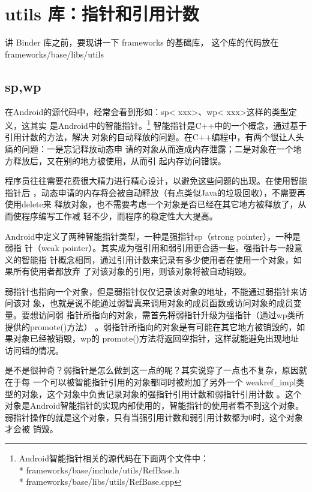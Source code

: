 \documentclass[a4paper,11pt]{article}
\begin{document}
\section{utils 库：指针和引用计数}
\iffalse
讲 Binder 库之前，要现讲一下 frameworks 的基础库， 这个库的代码放在
frameworks/base/libs/utils
\subsection{sp,wp}

在Android的源代码中，经常会看到形如：sp< xxx>、wp< xxx>这样的类型定义，这其实
是Android中的智能指针。\footnote{
Android智能指针相关的源代码在下面两个文件中：\\*
frameworks/base/include/utils/RefBase.h\\*
frameworks/base/libs/utils/RefBase.cpp
}
智能指针是C++中的一个概念，通过基于引用计数的方法，解决
对象的自动释放的问题。在C++编程中，有两个很让人头痛的问题：一是忘记释放动态申
请的对象从而造成内存泄露；二是对象在一个地方释放后，又在别的地方被使用，从而引
起内存访问错误。

程序员往往需要花费很大精力进行精心设计，以避免这些问题的出现。在使用智能指针后
，动态申请的内存将会被自动释放（有点类似Java的垃圾回收），不需要再使用delete来
释放对象，也不需要考虑一个对象是否已经在其它地方被释放了，从而使程序编写工作减
轻不少，而程序的稳定性大大提高。


Android中定义了两种智能指针类型，一种是强指针sp（strong pointer），一种是弱指
针（weak pointer）。其实成为强引用和弱引用更合适一些。强指针与一般意义的智能指
针概念相同，通过引用计数来记录有多少使用者在使用一个对象，如果所有使用者都放弃
了对该对象的引用，则该对象将被自动销毁。

弱指针也指向一个对象，但是弱指针仅仅记录该对象的地址，不能通过弱指针来访问该对
象，也就是说不能通过弱智真来调用对象的成员函数或访问对象的成员变量。要想访问弱
指针所指向的对象，需首先将弱指针升级为强指针（通过wp类所提供的promote()方法）
。弱指针所指向的对象是有可能在其它地方被销毁的，如果对象已经被销毁，wp的
promote()方法将返回空指针，这样就能避免出现地址访问错的情况。

是不是很神奇？弱指针是怎么做到这一点的呢？其实说穿了一点也不复杂，原因就在于每
一个可以被智能指针引用的对象都同时被附加了另外一个
weakref_impl类型的对象，这个对象中负责记录对象的强指针引用计数和弱指针引用计数
。这个对象是Android智能指针的实现内部使用的，智能指针的使用者看不到这个对象。
弱指针操作的就是这个对象，只有当强引用计数和弱引用计数都为0时，这个对象才会被
销毁。
\end{document}
